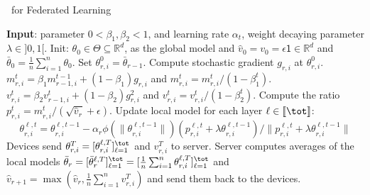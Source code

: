 \documentclass[11pt]{article}
\begin{document}
\begin{algorithm}[H]
\caption{\algo\ for Federated Learning} \label{alg:ldams}
\begin{algorithmic}[1]
\STATE \textbf{Input}: parameter $0< \beta_1, \beta_2 <1$, and learning rate $\alpha_t$, weight decaying parameter $\lambda \in ]0,1[$.
\STATE Init: $\theta_{0} \in \Theta \subseteq \mathbb R^d $, as the global model and $\hat v_0=v_{0} = \epsilon \mathsf{1} \in \mathbb R^{d}$ and $\bar{\theta}_0 =  \frac{1}{n} \sum_{i=1}^n \theta_0$.
\STATE Set $\theta_{r,i}^{0} = \bar{\theta}_{r-1}$.
\STATE Compute stochastic gradient $g_{r,i}$ at $\theta_{r,i}^{0}$.
\STATE $m^t_{r,i} = \beta_1 m^{t-1}_{r-1,i} + (1 - \beta_1) g_{r,i}$ and $m^{t}_{r,i}=m^{t}_{r,i} /\left(1-\beta_{1}^{t}\right)$. \label{line:new1}
\STATE $v^{t}_{r,i} = \beta_2 v^{t}_{r-1,i} + (1 - \beta_2) g_{r,i}^2$ and $v^{t}_{r,i}=v^{t}_{r,i} /\left(1-\beta_{2}^{t}\right)$. \label{line:new2}
\STATE Compute the ratio  $p_{r,i}^t=m^{t}_{r,i}/(\sqrt{\hat v_{r}}+\epsilon)$. \label{line:scale}
\STATE Update local model for each layer $\ell \in \llbracket \tot \rrbracket$: \label{line:layer}
$$\theta_{r,i}^{\ell,t}=\theta_{r,i}^{\ell,t-1}-\alpha_{r} \phi(\|\theta_{r,i}^{\ell,t-1}\|)(p_{r,i}^{\ell,t}+\lambda \theta_{r,i}^{\ell,t-1})/ \|p_{r,i}^{\ell,t}+\lambda \theta_{r,i}^{\ell,t-1}\|$$
\ENDFOR
\STATE Devices send $\theta_{r,i}^{T} = [\theta_{r,i}^{\ell,T}]_{\ell =1}^{\tot}$ and $v_{r,i}^T$ to server.
\ENDFOR
\STATE Server computes averages of the local models $\bar{\theta}_r = [\bar{\theta}_r^{\ell,T}]_{\ell =1}^{\tot} = [\frac{1}{n} \sum_{i=1}^n \theta_{r,i}^{\ell,T}]_{\ell =1}^{\tot}$ and $\hat{v}_{r+1} = \max( \hat{v}_{r},\frac{1}{n} \sum_{i=1}^n v^T_{r,i} )$ and send them back to the devices. \label{line:final}
\ENDFOR
\end{algorithmic}
\end{algorithm}
\end{document}
